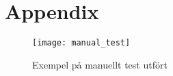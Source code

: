 \chapter{Appendix}
\label{sec:appendix}


\begin{figure}[h]
    \centering
    \texttt{[image: manual\_test]}
    \caption{Exempel på manuellt test utfört}
    \label{fig:manual_test}
\end{figure}